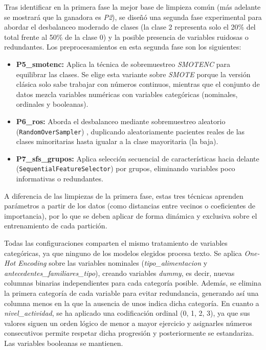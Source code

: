 \documentclass[journal,onecolumn]{IEEEtran}
\begin{document}
Tras identificar en la primera fase la mejor base de limpieza común (más adelante se mostrará que la ganadora es \textit{P2}), se diseñó una segunda fase experimental para abordar el desbalanceo moderado de clases \cite{he2009imbalanced} (la clase 2 representa solo el 20\% del total frente al 50\% de la clase 0) y la posible presencia de variables ruidosas o redundantes. Los preprocesamientos en esta segunda fase son los siguientes:

\begin{itemize}
    \item \textbf{P5\_smotenc:} Aplica la técnica de sobremuestreo \textit{SMOTENC} \cite{chawla2002smote} para equilibrar las clases. Se elige esta variante sobre \textit{SMOTE} porque la versión clásica solo sabe trabajar con números continuos, mientras que el conjunto de datos mezcla variables numéricas con variables categóricas (nominales, ordinales y booleanas).
    
    \item \textbf{P6\_ros:} Aborda el desbalanceo mediante sobremuestreo aleatorio (\texttt{RandomOverSampler}) \cite{lemaitre2017imblearn}, duplicando aleatoriamente pacientes reales de las clases minoritarias hasta igualar a la clase mayoritaria (la baja).
    
    \item \textbf{P7\_sfs\_grupos:} Aplica selección secuencial de características hacia delante (\texttt{SequentialFeatureSelector}) por grupos, eliminando variables poco informativas o redundantes.
\end{itemize}

A diferencia de las limpiezas de la primera fase, estas tres técnicas aprenden parámetros a partir de los datos (como distancias entre vecinos o coeficientes de importancia), por lo que se deben aplicar de forma dinámica y exclusiva sobre el entrenamiento de cada partición.

Todas las configuraciones comparten el mismo tratamiento de variables categóricas, ya que ninguno de los modelos elegidos procesa texto. Se aplica \textit{One-Hot Encoding} sobre las variables nominales (\textit{tipo\_alimentacion} y \textit{antecedentes\_familiares\_tipo}), creando variables \textit{dummy}, es decir, nuevas columnas binarias independientes para cada categoría posible. Además, se elimina la primera categoría de cada variable para evitar redundancia, generando así una columna menos en la que la ausencia de unos indica dicha categoría. En cuanto a \textit{nivel\_actividad}, se ha aplicado una codificación ordinal (0, 1, 2, 3), ya que sus valores siguen un orden lógico de menor a mayor ejercicio y asignarles números consecutivos permite respetar dicha progresión y posteriormente se estandariza. Las variables booleanas se mantienen.
\end{document}
